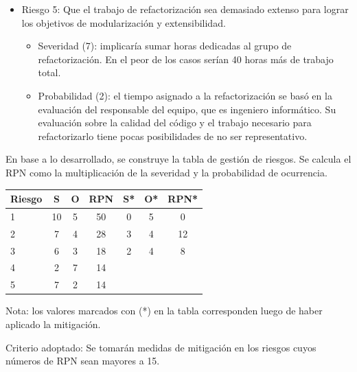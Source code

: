 \documentclass[
11pt, %
]{charter}
\begin{document}
\begin{itemize}
\begin{itemize}
\end{itemize}
\item Riesgo 5: Que el trabajo de refactorización sea demasiado extenso para lograr los objetivos de modularización y extensibilidad.
\begin{itemize}
\item Severidad (7): implicaría sumar horas dedicadas al grupo de refactorización. En el peor de los casos serían 40 horas más de trabajo total.
\item Probabilidad (2): el tiempo asignado a la refactorización se basó en la evaluación del responsable del equipo, que es ingeniero informático. Su evaluación sobre la calidad del código y el trabajo necesario para refactorizarlo tiene pocas posibilidades de no ser representativo.
\end{itemize}
\end{itemize}

En base a lo desarrollado, se construye la tabla de gestión de riesgos. Se calcula el RPN como
la multiplicación de la severidad y la probabilidad de ocurrencia.

\begin{table}[htpb]
\centering
\begin{tabularx}{\linewidth}{@{}|X|c|c|c|c|c|c|@{}}
\hline
\rowcolor[HTML]{C0C0C0} 
Riesgo & S & O & RPN & S* & O* & RPN* \\ \hline
   1   &  10 & 5  &  50   &  0  &  5  &  0    \\ \hline
   2   &  7 & 4  &   28  &  3  &  4  &   12   \\ \hline
   3   &  6 & 3  &   18  &  2  &   4 &   8   \\ \hline
   4   &  2 & 7 &   14 &    &    &      \\ \hline
   5   &  7 & 2  &  14   &    &    &      \\ \hline
\end{tabularx}%
\end{table}

Nota: los valores marcados con (*) en la tabla corresponden luego de haber aplicado la mitigación.

Criterio adoptado: 
Se tomarán medidas de mitigación en los riesgos cuyos números de RPN sean mayores a 15.
\end{document}
